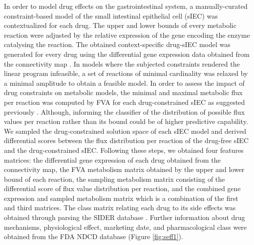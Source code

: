 In order to model drug effects on the gastrointestinal system, a manually-curated constraint-based model of the small intestinal epithelial cell (sIEC) \cite{sahoo2013predicting} was contextualized for each drug. The upper and lower bounds of every metabolic reaction were adjusted by the relative expression of the gene encoding the enzyme catalysing the reaction. The obtained context-specific drug-sIEC model was generated for every drug using the differential gene expression data obtained from the connectivity map \cite{subramanian2017next}. In models where the subjected constraints rendered the linear program infeasible, a set of reactions of minimal cardinality was relaxed by a minimal amplitude to obtain a feasible model. In order to assess the impact of drug constraints on metabolic models, the minimal and maximal metabolic flux per reaction was computed by FVA for each drug-constrained sIEC as suggested previously \cite{shaked2016metabolic}. Although, informing the classifier of the distribution of possible flux values per reaction rather than its bound could be of higher predictive capability. We sampled the drug-constrained solution space of each sIEC model and derived differential scores between the flux distribution per reaction of the drug-free sIEC and the drug-constrained sIEC. Following these steps, we obtained four features matrices: the differential gene expression of each drug obtained from the connectivity map, the FVA metabolism matrix obtained by the upper and lower bound of each reaction, the sampling metabolism matrix consisting of the differential score of flux value distribution per reaction, and the combined gene expression and sampled metabolism matrix which is a combination of the first and third matrices. The class matrix relating each drug to its side effects was obtained through parsing the SIDER database \cite{kuhn2015sider}. Further information about drug mechanisms, physiological effect, marketing date, and pharmacological class were obtained from the FDA NDCD database (Figure \ref{fig:seff1}).
